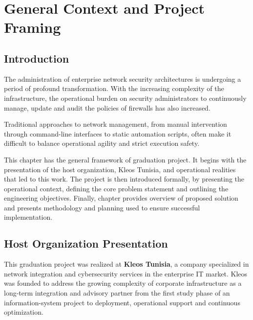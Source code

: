 %

\chapter{General Context and Project Framing}

\section{Introduction}
The administration of enterprise network security architectures is undergoing a period of profound transformation.  With the increasing complexity of the infrastructure, the operational burden on security administrators to continuously manage, update and audit the policies of firewalls has also increased. 

Traditional approaches to network management, from manual intervention through command-line interfaces to static automation scripts, often make it difficult to balance operational agility and strict execution safety.

This chapter has the general framework of graduation project. It begins with the presentation of the host organization, Kleos Tunisia, and operational realities that led to this work. The project is then introduced formally, by presenting the operational context, defining the core problem statement and outlining the engineering objectives. Finally, chapter provides overview of proposed solution and presents methodology and planning used to ensure successful implementation.
\section{Host Organization Presentation}

This graduation project was realized at \textbf{Kleos Tunisia}, a company specialized in network integration and cybersecurity services in the enterprise IT market. Kleos was founded to address the growing complexity of corporate infrastructure as a long-term integration and advisory partner from the first study phase of an information-system project to deployment, operational support and continuous optimization.

